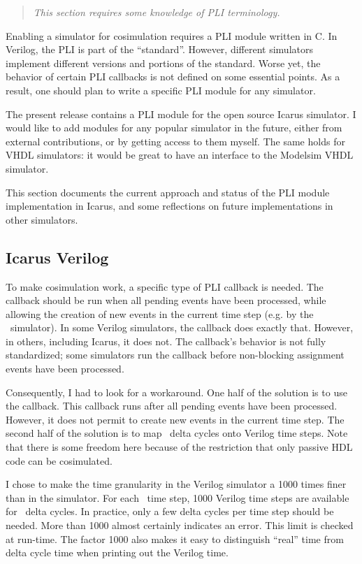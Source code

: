 \begin{quote}
\em
This section requires some knowledge of PLI terminology.
\end{quote}

Enabling a simulator for cosimulation requires a PLI module
written in C. In Verilog, the PLI is part of the ``standard''.
However, different simulators implement different versions 
and portions of the standard. Worse yet, the behavior of
certain PLI callbacks is not defined on some essential points. 
As a result, one should plan to write a specific PLI module
for any simulator.

The present release contains a PLI module for the 
open source Icarus simulator. I would like to add
modules for any popular simulator in the future,
either from external contributions, or by getting
access to them myself. The same holds for VHDL
simulators: it would be great to have an interface
to the Modelsim VHDL simulator.

This section documents
the current approach and status of the PLI module
implementation in Icarus, and some reflections
on future implementations in other simulators.

\subsection{Icarus Verilog}

To make cosimulation work, a specific type of PLI callback is
needed. The callback should be run when all pending events have been
processed, while allowing the creation of new events in the current
time step (e.g. by the \myhdl\ simulator).  In some Verilog simulators,
the  callback does exactly that. However,
in others, including Icarus, it does not. The callback's behavior is
not fully standardized; some simulators run the callback before
non-blocking assignment events have been processed.

Consequently, I had to look for a workaround. One half of the solution
is to use the  callback.  This callback runs
after all pending events have been processed.  However, it does not
permit to create new events in the current time step.  The second half
of the solution is to map \myhdl\ delta cycles onto Verilog time steps.
Note that there is some freedom here because of the restriction that
only passive HDL code can be cosimulated.

I chose to make the time granularity in the Verilog simulator a 1000
times finer than in the \myhdl{} simulator. For each \myhdl\ time step,
1000 Verilog time steps are available for  \myhdl\ delta cycles. In practice,
only a few delta cycles per time step should be needed. More than 1000
almost certainly indicates an error. This limit is checked at
run-time. The factor 1000 also makes it easy to distinguish ``real''
time from delta cycle time when printing out the Verilog time.

